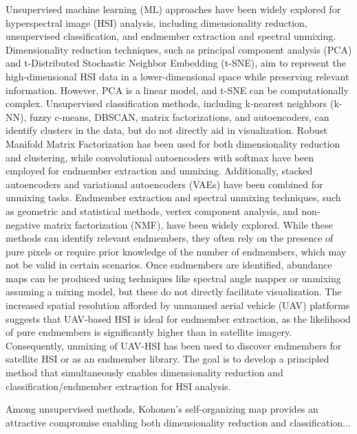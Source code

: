 \documentclass[remotesensing,article,submit,pdftex,moreauthors]{Definitions/mdpi}
\begin{document}
Unsupervised machine learning (ML) approaches have been widely explored for hyperspectral image (HSI) analysis, including dimensionality reduction, unsupervised classification, and endmember extraction and spectral unmixing. Dimensionality reduction techniques, such as principal component analysis (PCA) and t-Distributed Stochastic Neighbor Embedding (t-SNE), aim to represent the high-dimensional HSI data in a lower-dimensional space while preserving relevant information. However, PCA is a linear model, and t-SNE can be computationally complex. Unsupervised classification methods, including k-nearest neighbors (k-NN), fuzzy c-means, DBSCAN, matrix factorizations, and autoencoders, can identify clusters in the data, but do not directly aid in visualization. Robust Manifold Matrix Factorization has been used for both dimensionality reduction and clustering, while convolutional autoencoders with softmax have been employed for endmember extraction and unmixing. Additionally, stacked autoencoders and variational autoencoders (VAEs) have been combined for unmixing tasks. Endmember extraction and spectral unmixing techniques, such as geometric and statistical methods, vertex component analysis, and non-negative matrix factorization (NMF), have been widely explored. While these methods can identify relevant endmembers, they often rely on the presence of pure pixels or require prior knowledge of the number of endmembers, which may not be valid in certain scenarios. Once endmembers are identified, abundance maps can be produced using techniques like spectral angle mapper or unmixing assuming a mixing model, but these do not directly facilitate visualization. The increased spatial resolution afforded by unmanned aerial vehicle (UAV) platforms suggests that UAV-based HSI is ideal for endmember extraction, as the likelihood of pure endmembers is significantly higher than in satellite imagery. Consequently, unmixing of UAV-HSI has been used to discover endmembers for satellite HSI or as an endmember library. The goal is to develop a principled method that simultaneously enables dimensionality reduction and classification/endmember extraction for HSI analysis.



Among unsupervised methods, Kohonen's self-organizing map provides an attractive compromise enabling both dimensionality reduction and classification...





\end{document}
